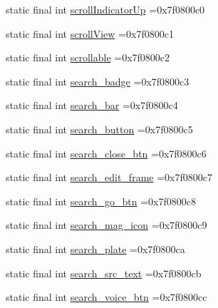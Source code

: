 \begin{DoxyCompactItemize}
\item 
static final int \mbox{\hyperlink{classcom_1_1example_1_1trainawearapplication_1_1_r_1_1id_af8cb0fa33400a3489722886cc8cdd4ab}{scroll\+Indicator\+Up}} =0x7f0800c0
\item 
static final int \mbox{\hyperlink{classcom_1_1example_1_1trainawearapplication_1_1_r_1_1id_ae18ebfcbf321cee37fe8215c0c6061ce}{scroll\+View}} =0x7f0800c1
\item 
static final int \mbox{\hyperlink{classcom_1_1example_1_1trainawearapplication_1_1_r_1_1id_a0b0c0580e1ed1ed93e834bd0648b4326}{scrollable}} =0x7f0800c2
\item 
static final int \mbox{\hyperlink{classcom_1_1example_1_1trainawearapplication_1_1_r_1_1id_aa1947f43d506818478a431b1e4fad074}{search\+\_\+badge}} =0x7f0800c3
\item 
static final int \mbox{\hyperlink{classcom_1_1example_1_1trainawearapplication_1_1_r_1_1id_a39179c07c9b805c967e006e9306344a3}{search\+\_\+bar}} =0x7f0800c4
\item 
static final int \mbox{\hyperlink{classcom_1_1example_1_1trainawearapplication_1_1_r_1_1id_ad8689c3cc298b28cd941a439bcdfaa42}{search\+\_\+button}} =0x7f0800c5
\item 
static final int \mbox{\hyperlink{classcom_1_1example_1_1trainawearapplication_1_1_r_1_1id_a6eb271b4b2d6255c0e959e40aa30846c}{search\+\_\+close\+\_\+btn}} =0x7f0800c6
\item 
static final int \mbox{\hyperlink{classcom_1_1example_1_1trainawearapplication_1_1_r_1_1id_ac234459e477eea714e6b73fd41b4e97f}{search\+\_\+edit\+\_\+frame}} =0x7f0800c7
\item 
static final int \mbox{\hyperlink{classcom_1_1example_1_1trainawearapplication_1_1_r_1_1id_a5f7e52a6f1bbe1507236e7de918b95d7}{search\+\_\+go\+\_\+btn}} =0x7f0800c8
\item 
static final int \mbox{\hyperlink{classcom_1_1example_1_1trainawearapplication_1_1_r_1_1id_a96f0b968579d1c2fbe58b090a56b55ba}{search\+\_\+mag\+\_\+icon}} =0x7f0800c9
\item 
static final int \mbox{\hyperlink{classcom_1_1example_1_1trainawearapplication_1_1_r_1_1id_a0868ccd91f930e5925e3576315ac200b}{search\+\_\+plate}} =0x7f0800ca
\item 
static final int \mbox{\hyperlink{classcom_1_1example_1_1trainawearapplication_1_1_r_1_1id_a90cde268e3606257aeadccf7a4448cd7}{search\+\_\+src\+\_\+text}} =0x7f0800cb
\item 
static final int \mbox{\hyperlink{classcom_1_1example_1_1trainawearapplication_1_1_r_1_1id_affdd1202b31da0d06aaed026394ea2e2}{search\+\_\+voice\+\_\+btn}} =0x7f0800cc

\end{DoxyCompactItemize}

